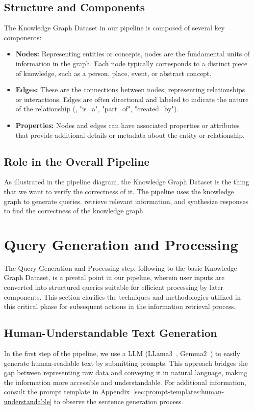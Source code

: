 \subsection{Structure and Components}\label{subsec:structure-and-components}
The Knowledge Graph Dataset in our pipeline is composed of several key components:
\begin{itemize}
    \item \textbf{Nodes:} Representing entities or concepts, nodes are the fundamental units of information in the graph. Each node typically corresponds to a distinct piece of knowledge, such as a person, place, event, or abstract concept.
    \item \textbf{Edges:} These are the connections between nodes, representing relationships or interactions. Edges are often directional and labeled to indicate the nature of the relationship (\ex, "is\_a", "part\_of", "created\_by").
    \item \textbf{Properties:} Nodes and edges can have associated properties or attributes that provide additional details or metadata about the entity or relationship.
\end{itemize}

\subsection{Role in the Overall Pipeline}\label{subsec:role-in-the-overall-pipeline}
As illustrated in the pipeline diagram, the Knowledge Graph Dataset is the thing that we want to verify the correctness of it.
The pipeline uses the knowledge graph to generate queries, retrieve relevant information, and synthesize responses to find the correctness of the knowledge graph.

\section{Query Generation and Processing}\label{sec:query-generation-and-processing}
The Query Generation and Processing step, following to the basic Knowledge Graph Dataset, is a pivotal point in our pipeline, wherein user inputs are converted into structured queries suitable for efficient processing by later components.
This section clarifies the techniques and methodologies utilized in this critical phase for subsequent actions in the information retrieval process.

\subsection{Human-Understandable Text Generation}\label{subsec:human-understandable-text-generation}
In the first step of the pipeline, we use a LLM (\ie LLama3~\cite{dubey2024llama3herdmodels}, Gemma2~\cite{gemmateam2024gemma2improvingopen}) to easily generate human-readable text by submitting prompts.
This approach bridges the gap between representing raw data and conveying it in natural language, making the information more accessible and understandable.
For additional information, consult the prompt template in Appendix~\ref{sec:prompt-templates:human-understandable} to observe the sentence generation process.

